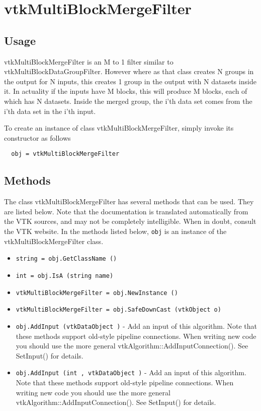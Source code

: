 \section{vtkMultiBlockMergeFilter}

\subsection{Usage}

 vtkMultiBlockMergeFilter is an M to 1 filter similar to 
 vtkMultiBlockDataGroupFilter. However where as that class creates N groups 
 in the output for N inputs, this creates 1 group in the output with N 
 datasets inside it. In actuality if the inputs have M blocks, this will 
 produce M blocks, each of which has N datasets. Inside the merged group, 
 the i'th data set comes from the i'th data set in the i'th input.

To create an instance of class vtkMultiBlockMergeFilter, simply
invoke its constructor as follows
\begin{verbatim}
  obj = vtkMultiBlockMergeFilter
\end{verbatim}
\subsection{Methods}

The class vtkMultiBlockMergeFilter has several methods that can be used.
  They are listed below.
Note that the documentation is translated automatically from the VTK sources,
and may not be completely intelligible.  When in doubt, consult the VTK website.
In the methods listed below, \verb|obj| is an instance of the vtkMultiBlockMergeFilter class.
\begin{itemize}
\item  \verb|string = obj.GetClassName ()|

\item  \verb|int = obj.IsA (string name)|

\item  \verb|vtkMultiBlockMergeFilter = obj.NewInstance ()|

\item  \verb|vtkMultiBlockMergeFilter = obj.SafeDownCast (vtkObject o)|

\item  \verb|obj.AddInput (vtkDataObject )| -  Add an input of this algorithm.  Note that these methods support
 old-style pipeline connections.  When writing new code you should
 use the more general vtkAlgorithm::AddInputConnection().  See
 SetInput() for details.

\item  \verb|obj.AddInput (int , vtkDataObject )| -  Add an input of this algorithm.  Note that these methods support
 old-style pipeline connections.  When writing new code you should
 use the more general vtkAlgorithm::AddInputConnection().  See
 SetInput() for details.

\end{itemize}
